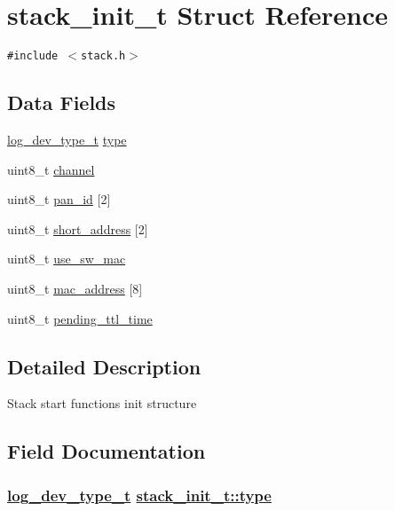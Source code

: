 \hypertarget{structstack__init__t}{
\section{stack\_\-init\_\-t Struct Reference}
\label{structstack__init__t}
}
{\tt \#include $<$stack.h$>$}

\subsection*{Data Fields}
\begin{CompactItemize}
\item 
\hyperlink{stack_8h_2af35922006e25ad6270937397391c79}{log\_\-dev\_\-type\_\-t} \hyperlink{structstack__init__t_6ac3dd68e3b2e8d832bd4783621dd4e6}{type}
\item 
uint8\_\-t \hyperlink{structstack__init__t_8c9d5d500e1c3cabe2d2b5950d09c39d}{channel}
\item 
uint8\_\-t \hyperlink{structstack__init__t_0b3e8601ce7872c7f84e6cca0578df99}{pan\_\-id} \mbox{[}2\mbox{]}
\item 
uint8\_\-t \hyperlink{structstack__init__t_05a9f2e4bedbe10b126a776c42e00194}{short\_\-address} \mbox{[}2\mbox{]}
\item 
uint8\_\-t \hyperlink{structstack__init__t_f2ce0b6ca35ce13964f9bfe6b728f68a}{use\_\-sw\_\-mac}
\item 
uint8\_\-t \hyperlink{structstack__init__t_e19c2be8fe2556624797d574f870626d}{mac\_\-address} \mbox{[}8\mbox{]}
\item 
uint8\_\-t \hyperlink{structstack__init__t_2b6a33578db7e0963d6c33431dd19c1d}{pending\_\-ttl\_\-time}
\end{CompactItemize}


\subsection{Detailed Description}
Stack start functions init structure 



\subsection{Field Documentation}
\hypertarget{structstack__init__t_6ac3dd68e3b2e8d832bd4783621dd4e6}{
\subsubsection[type]{\setlength{\rightskip}{0pt plus 5cm}\hyperlink{stack_8h_2af35922006e25ad6270937397391c79}{log\_\-dev\_\-type\_\-t} \hyperlink{structstack__init__t_6ac3dd68e3b2e8d832bd4783621dd4e6}{stack\_\-init\_\-t::type}}}
\label{structstack__init__t_6ac3dd68e3b2e8d832bd4783621dd4e6}


